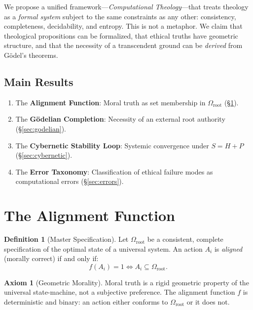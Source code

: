 \documentclass[12pt, a4paper]{article}
\theoremstyle{plain}
\theoremstyle{definition}
\newtheorem{definition}[theorem]{Definition}
\newtheorem{axiom}[theorem]{Axiom}
\theoremstyle{remark}
\begin{document}
We propose a unified framework---\emph{Computational Theology}---that
treats theology as a \emph{formal system} subject to the same constraints
as any other: consistency, completeness, decidability, and entropy. This
is not a metaphor. We claim that theological propositions can be formalized,
that ethical truths have geometric structure, and that the necessity of a
transcendent ground can be \emph{derived} from G\"odel's theorems.

\subsection{Main Results}
\begin{enumerate}
  \item The \textbf{Alignment Function}: Moral truth as set membership
    in $\Omega_{\text{root}}$ (\S\ref{sec:alignment}).
  \item The \textbf{G\"odelian Completion}: Necessity of an external root
    authority (\S\ref{sec:godelian}).
  \item The \textbf{Cybernetic Stability Loop}: Systemic convergence under
    $S = H + P$ (\S\ref{sec:cybernetic}).
  \item The \textbf{Error Taxonomy}: Classification of ethical failure modes
    as computational errors (\S\ref{sec:errors}).
\end{enumerate}

\section{The Alignment Function}\label{sec:alignment}

\begin{definition}[Master Specification]\label{def:omega}
  Let $\Omega_{\text{root}}$ be a consistent, complete specification of the
  optimal state of a universal system. An action $A_i$ is \emph{aligned}
  (morally correct) if and only if:
  \begin{equation}\label{eq:alignment}
    f(A_i) = 1 \iff A_i \subseteq \Omega_{\text{root}}.
  \end{equation}
\end{definition}

\begin{axiom}[Geometric Morality]\label{ax:geometric}
  Moral truth is a rigid geometric property of the universal state-machine,
  not a subjective preference. The alignment function $f$ is deterministic
  and binary: an action either conforms to $\Omega_{\text{root}}$ or it
  does not.
\end{axiom}
\end{document}
